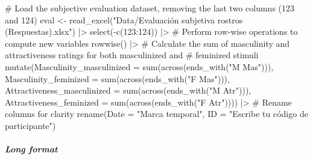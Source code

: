 \documentclass[
  bookmarksnumbered]{article}
\newenvironment{Shaded}{\begin{snugshade}}{\end{snugshade}}
\newcommand{\AttributeTok}[1]{\textcolor[rgb]{0.80,0.80,0.80}{#1}}
\newcommand{\CommentTok}[1]{\textcolor[rgb]{0.50,0.62,0.50}{#1}}
\newcommand{\DecValTok}[1]{\textcolor[rgb]{0.86,0.86,0.80}{#1}}
\newcommand{\FunctionTok}[1]{\textcolor[rgb]{0.94,0.94,0.56}{#1}}
\newcommand{\NormalTok}[1]{\textcolor[rgb]{0.80,0.80,0.80}{#1}}
\newcommand{\OtherTok}[1]{\textcolor[rgb]{0.94,0.94,0.56}{#1}}
\newcommand{\SpecialCharTok}[1]{\textcolor[rgb]{0.86,0.64,0.64}{#1}}
\newcommand{\StringTok}[1]{\textcolor[rgb]{0.80,0.58,0.58}{#1}}
\begin{document}
\begin{Shaded}
\begin{Highlighting}[]
\CommentTok{\# Load the subjective evaluation dataset, removing the last two columns (123 and 124)}
\NormalTok{eval }\OtherTok{\textless{}{-}} \FunctionTok{read\_excel}\NormalTok{(}\StringTok{"Data/Evaluación subjetiva rostros (Respuestas).xlsx"}\NormalTok{) }\SpecialCharTok{|\textgreater{}} 
  \FunctionTok{select}\NormalTok{(}\SpecialCharTok{{-}}\FunctionTok{c}\NormalTok{(}\DecValTok{123}\SpecialCharTok{:}\DecValTok{124}\NormalTok{)) }\SpecialCharTok{|\textgreater{}} 
  \CommentTok{\# Perform row{-}wise operations to compute new variables}
  \FunctionTok{rowwise}\NormalTok{() }\SpecialCharTok{|\textgreater{}} 
  \CommentTok{\# Calculate the sum of masculinity and attractiveness ratings for both masculinized and }
  \CommentTok{\# feminized stimuli}
  \FunctionTok{mutate}\NormalTok{(}\AttributeTok{Masculinity\_masculinized =} \FunctionTok{sum}\NormalTok{(}\FunctionTok{across}\NormalTok{(}\FunctionTok{ends\_with}\NormalTok{(}\StringTok{"M Mas"}\NormalTok{))),}
         \AttributeTok{Masculinity\_feminized =} \FunctionTok{sum}\NormalTok{(}\FunctionTok{across}\NormalTok{(}\FunctionTok{ends\_with}\NormalTok{(}\StringTok{"F Mas"}\NormalTok{))),}
         \AttributeTok{Attractiveness\_masculinized =} \FunctionTok{sum}\NormalTok{(}\FunctionTok{across}\NormalTok{(}\FunctionTok{ends\_with}\NormalTok{(}\StringTok{"M Atr"}\NormalTok{))),}
         \AttributeTok{Attractiveness\_feminized =} \FunctionTok{sum}\NormalTok{(}\FunctionTok{across}\NormalTok{(}\FunctionTok{ends\_with}\NormalTok{(}\StringTok{"F Atr"}\NormalTok{)))) }\SpecialCharTok{|\textgreater{}} 
  \CommentTok{\# Rename columns for clarity}
  \FunctionTok{rename}\NormalTok{(}\AttributeTok{Date =} \StringTok{"Marca temporal"}\NormalTok{,}
         \AttributeTok{ID =} \StringTok{"Escribe tu código de participante"}\NormalTok{)}
\end{Highlighting}
\end{Shaded}

\subparagraph{Long format}\label{long-format}
\end{document}

